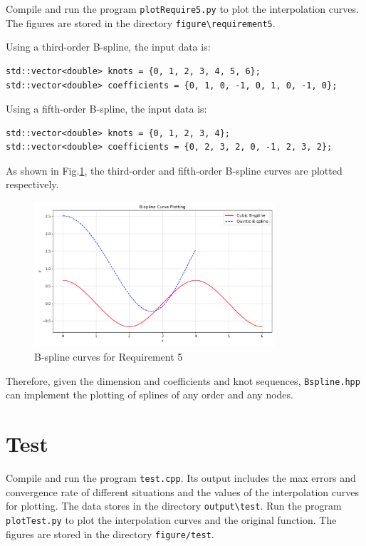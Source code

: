 \documentclass[a4paper]{article}
\begin{document}
\begin{sloppypar}
Compile and run the program \verb|plotRequire5.py| to plot the interpolation
curves. The figures are stored in the directory \verb|figure\requirement5|.

Using a third-order B-spline, the input data is:
\begin{verbatim}
std::vector<double> knots = {0, 1, 2, 3, 4, 5, 6};
std::vector<double> coefficients = {0, 1, 0, -1, 0, 1, 0, -1, 0};
\end{verbatim}

Using a fifth-order B-spline, the input data is:
\begin{verbatim}
std::vector<double> knots = {0, 1, 2, 3, 4};
std::vector<double> coefficients = {0, 2, 3, 2, 0, -1, 2, 3, 2};
\end{verbatim}

As shown in Fig.\ref{fig:require5_bspline_curves}, the third-order and
fifth-order B-spline curves are plotted respectively.

\begin{figure}[H]
  \centering
  \includegraphics[width=0.8\textwidth]{../figure/requirement5/bspline_curves.png}
  \renewcommand{\figurename}{Fig.}
  \caption{B-spline curves for Requirement 5}
  \label{fig:require5_bspline_curves}
\end{figure}

Therefore, given the dimension and coefficients and knot sequences,
\verb|Bspline.hpp| can implement the plotting of splines of any order and any
nodes.

\section{Test}
Compile and run the program \verb|test.cpp|. Its output includes the max errors and convergence rate of different situations and the values of the interpolation curves for plotting. The data stores in the directory \verb|output\test|.
Run the program \verb|plotTest.py| to plot the interpolation curves and the original function. The figures are stored in the directory \verb|figure/test|.


\end{sloppypar}
\end{document}
